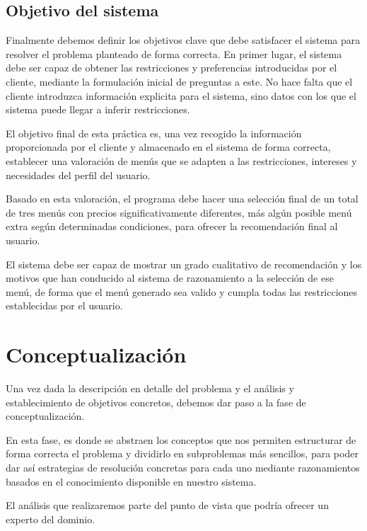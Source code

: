 \documentclass{article}
\begin{document}
\subsection{Objetivo del sistema}
Finalmente debemos definir los objetivos clave que debe satisfacer el sistema para resolver el problema planteado de forma correcta. En primer lugar, el sistema debe ser capaz de obtener las restricciones y preferencias introducidas por el cliente, mediante la formulación inicial de preguntas a este. No hace falta que el cliente introduzca información explicita para el sistema, sino datos con los que el sistema puede llegar a inferir restricciones.
\par
El objetivo final de esta práctica es, una vez recogido la información proporcionada por el cliente y almacenado en el sistema de forma correcta, establecer una valoración de menús que se adapten a las restricciones, intereses y necesidades del perfil del usuario.
\par
Basado en esta valoración, el programa debe hacer una selección final de un total de tres menús con precios significativamente diferentes, más algún posible menú extra según determinadas condiciones, para ofrecer la recomendación final al usuario.
\par
El sistema debe ser capaz de mostrar un grado cualitativo de recomendación y los motivos que han conducido al sistema de razonamiento a la selección de ese menú, de forma que el menú generado sea valido y cumpla todas las restricciones establecidas por el usuario.

\newpage
\section{Conceptualización}
Una vez dada la descripción en detalle del problema y el análisis  y establecimiento de objetivos concretos, debemos dar paso a la fase de conceptualización.
\par
En esta fase, es donde se abstraen los conceptos que nos permiten estructurar de forma correcta el problema y dividirlo en subproblemas más sencillos, para poder dar así estrategias de resolución concretas para cada uno mediante razonamientos basados en el conocimiento disponible en nuestro sistema.
\par
El análisis que realizaremos parte del punto de vista que podría ofrecer un experto del dominio.
\end{document}
